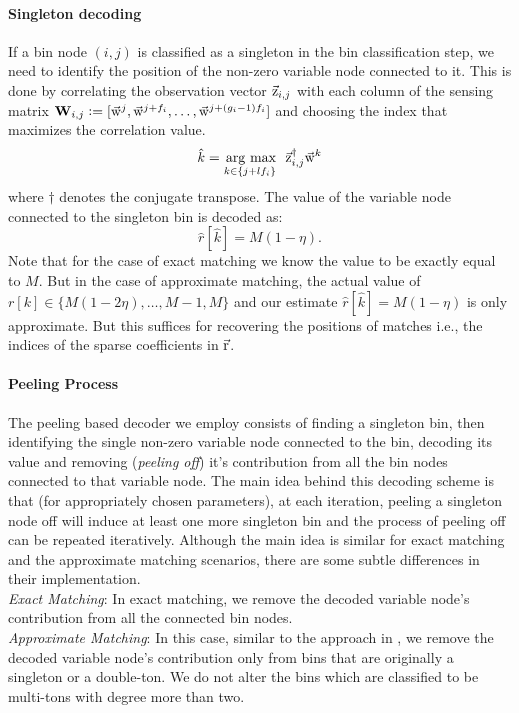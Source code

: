 \paragraph*{Singleton decoding}
If a bin node $(i,j)$ is classified as a singleton in the bin classification step, we need to identify the position of the non-zero variable node connected to it. This is done by correlating the observation vector $\vec{\mathrm{z}}_{i,j}$ with each column of the sensing matrix  $\mathbf{W}_{i,j} \mathrel{\mathop:}= [\vec{\mathrm{w}}^{j},\vec{\mathrm{w}}^{j+f_i},\ldots,   \vec{\mathrm{w}}^{j+(g_i-1)f_i}]$ and choosing the index that maximizes the correlation value.
\begin{align*}
 \hat{k} = \underset{k\in\{j+l f_i\}}{\operatorname*{\,arg\ max}}~~ \vec{\mathrm{z}}^{\dagger}_{i,j} \vec{\mathrm{w}}^{k}
\end{align*}
where $\dagger$ denotes the conjugate transpose. The value of the variable node connected to the singleton bin is decoded as:
 $$
 \hat{r}[\hat{k}]=M(1-\eta).
 $$\vspace{-3pt}
 Note that for the case of exact matching we know the value to be exactly equal to $M$. But in the case of approximate matching, the actual value of $r[k]\in\{M(1-2\eta),\ldots,M-1,M\}$ and our estimate $\hat{r}[\hat{k}]=M(1-\eta)$ is only approximate. But this suffices for recovering the positions of matches i.e., the indices of the sparse coefficients in $\vec{\mathrm{r}}$.			

\paragraph*{Peeling Process} The peeling based decoder we employ consists of finding a singleton bin, then identifying the single non-zero variable node connected to the bin, decoding its value and removing ({\it peeling off}) it's contribution from all the bin nodes connected to that variable node. The main idea behind this decoding scheme is that (for appropriately chosen parameters), at each iteration, peeling a singleton node off will induce at least one more singleton bin and the process of peeling off can be repeated iteratively. Although the main idea is similar for exact matching and the approximate matching scenarios, there are some subtle differences in their implementation.\\
{\it Exact Matching}: In exact matching, we remove the decoded variable node's contribution from all the connected bin nodes.\\
{\it Approximate Matching}: In this case, similar to the approach in \cite{lee2015saffron},  we remove the decoded variable node's contribution only from bins that are originally a singleton or a double-ton. We do not alter the bins which are classified to be multi-tons with degree more than two.

